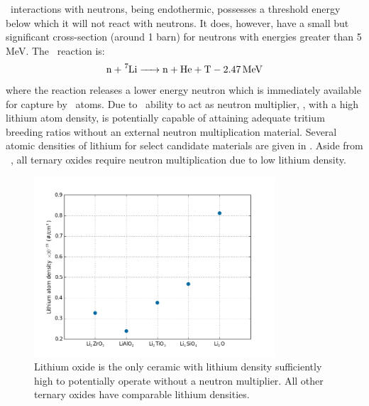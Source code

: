 \documentclass[11pt]{report} %
\newcommand{\lio}{\ce{Li2O}}
\newcommand{\lisev}{\ce{^7Li}}
\newcommand{\lisix}{\ce{^6Li}}
\begin{document}
\lisev~interactions with neutrons, being endothermic, possesses a threshold energy below which it will not react with neutrons. It does, however, have a small but significant cross-section (around 1 barn) for neutrons with energies greater than 5 MeV. The \lisev~reaction is:
\begin{align}
\ce{n + ^7Li -> n + He + T}-\SI{2.47}{\mega\electronvolt}\label{eq:Li7T}
\end{align}
where the reaction releases a lower energy neutron which is immediately available for capture by \lisix~atoms. Due to \lisev~ability to act as neutron multiplier, \lio, with a high lithium atom density, is potentially capable of attaining adequate tritium breeding ratios without an external neutron multiplication material. Several atomic densities of lithium for select candidate materials are given in . Aside from \lio~, all ternary oxides require neutron multiplication due to low lithium density.

\begin{figure}[ht]
\centering
\includegraphics[width=0.8\textwidth]{images/li-density} 
\caption{Lithium oxide is the only ceramic with lithium density sufficiently high to potentially operate without a neutron multiplier. All other ternary oxides have comparable lithium densities.}
\label{fig:li-density}
\end{figure}


\end{document}
